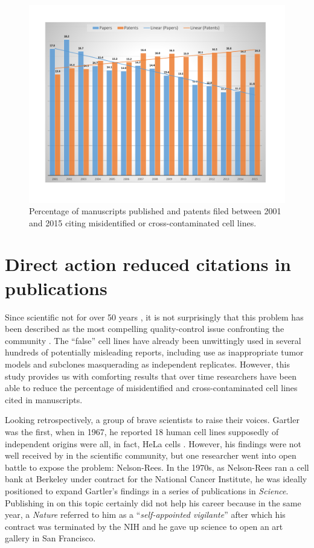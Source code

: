 \documentclass[12pt]{article}
\begin{document}
\begin{figure}[b!]
\centering
	\includegraphics[width=.75\textwidth]{Graph.pdf}
	\caption{\label{fig1}Percentage of manuscripts published and patents filed between 2001 and 2015 citing misidentified or cross-contaminated cell lines.}
\end{figure}


\section*{Direct action reduced citations in publications}

Since  scientific   not  for over 50 years , it is not surprisingly that this problem has been described as the most compelling quality-control issue confronting the community \cite{nardone2008curbing}. The ``false'' cell lines have already been unwittingly used in several hundreds of potentially misleading reports, including use as inappropriate tumor models and subclones masquerading as independent replicates. However, this study provides us with comforting results that over time researchers have been able to reduce the percentage of misidentified and cross-contaminated cell lines cited in manuscripts. 

Looking retrospectively,  a group of brave scientists to raise their voices. Gartler was the first, when in 1967, he reported 18 human cell lines supposedly of independent origins were all, in fact, HeLa cells \cite{gartler1967genetic}. However, his findings were not well received by in the scientific community, but one researcher went into open battle to expose the problem: Nelson-Rees. In the 1970s, as Nelson-Rees ran a cell bank at Berkeley under contract for the National Cancer Institute, he was ideally positioned to expand Gartler's findings in a series of publications in \textit{Science}\cite{nelson1976hela, nelson1981cross, nelson1974banded}. Publishing in on this topic certainly did not help his career because in the same year, a \textit{Nature} referred to him as a ``\textit{self-appointed vigilante}'' \cite{maddox1981responsibility} after which his contract was terminated by the NIH and he gave up science to open an art gallery in San Francisco. 
\end{document}
